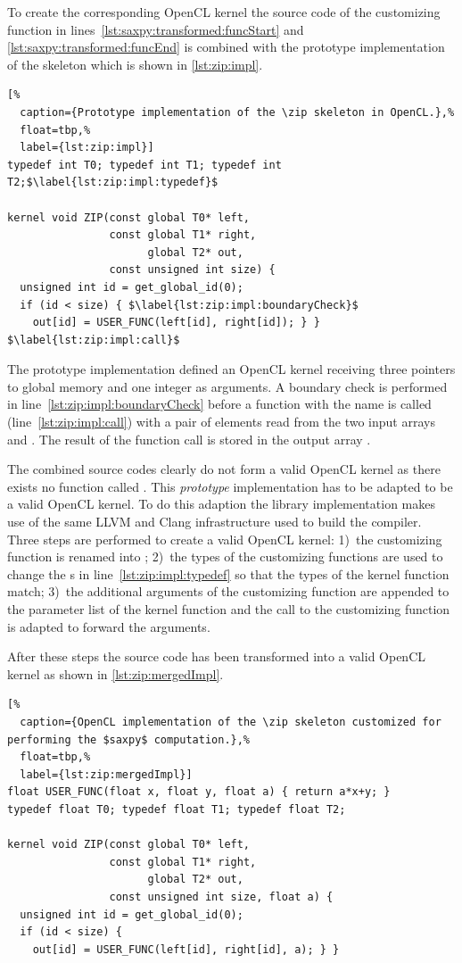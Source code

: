 To create the corresponding OpenCL kernel the source code of the customizing function in lines~\ref{lst:saxpy:transformed:funcStart} and \ref{lst:saxpy:transformed:funcEnd} is combined with the prototype implementation of the \zip skeleton which is shown in \autoref{lst:zip:impl}.
%
\begin{lstlisting}[%
  caption={Prototype implementation of the \zip skeleton in OpenCL.},%
  float=tbp,%
  label={lst:zip:impl}]
typedef int T0; typedef int T1; typedef int T2;$\label{lst:zip:impl:typedef}$

kernel void ZIP(const global T0* left,
                const global T1* right,
                      global T2* out,
                const unsigned int size) {
  unsigned int id = get_global_id(0);
  if (id < size) { $\label{lst:zip:impl:boundaryCheck}$
    out[id] = USER_FUNC(left[id], right[id]); } }  $\label{lst:zip:impl:call}$
\end{lstlisting}
%
The prototype implementation defined an OpenCL kernel  receiving three pointers to global memory and one integer as arguments.
A boundary check is performed in line~\ref{lst:zip:impl:boundaryCheck} before a function with the name  is called (line~\ref{lst:zip:impl:call}) with a pair of elements read from the two input arrays  and .
The result of the function call is stored in the output array .

The combined source codes clearly do not form a valid OpenCL kernel as there exists no function called .
This \emph{prototype} implementation has to be adapted to be a valid OpenCL kernel.
To do this adaption the \SkelCL library implementation makes use of the same LLVM and Clang infrastructure used to build the  compiler.
Three steps are performed to create a valid OpenCL kernel:
1)~the customizing function is renamed into ;
2)~the types of the customizing functions are used to change the s in line~\ref{lst:zip:impl:typedef} so that the types of the kernel function  match;
3)~the additional arguments of the customizing function are appended to the parameter list of the kernel function  and the call to the customizing function is adapted to forward the arguments.

After these steps the source code has been transformed into a valid OpenCL kernel as shown in \autoref{lst:zip:mergedImpl}.
\begin{lstlisting}[%
  caption={OpenCL implementation of the \zip skeleton customized for performing the $saxpy$ computation.},%
  float=tbp,%
  label={lst:zip:mergedImpl}]
float USER_FUNC(float x, float y, float a) { return a*x+y; }
typedef float T0; typedef float T1; typedef float T2;

kernel void ZIP(const global T0* left,
                const global T1* right,
                      global T2* out,
                const unsigned int size, float a) {
  unsigned int id = get_global_id(0);
  if (id < size) {
    out[id] = USER_FUNC(left[id], right[id], a); } }
\end{lstlisting}


